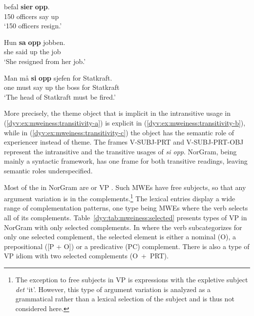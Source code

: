 \documentclass[output=paper]{langsci/langscibook}
\begin{document}
\ea \label{dyv:ex:mweiness:transitivity-a}  befal \textbf{sier} \textbf{opp}. \\ 
     150 officers say up\\
\glt `150 officers resign.' \\ 
\z

\ea \label{dyv:ex:mweiness:transitivity-b} \gll Hun \textbf{sa} \textbf{opp} jobben. \\
     she said up {the job} \\
\glt `She resigned from her job.' \\
\z

\ea \label{dyv:ex:mweiness:transitivity-c} \gll Man må \textbf{si} \textbf{opp} sjefen for Statkraft. \\
      one must say up {the boss} for Statkraft \\
\glt `The head of Statkraft must be fired.' 
\z

More precisely, the theme object that is implicit in the intransitive usage in (\ref{dyv:ex:mweiness:transitivity-a}) is explicit in (\ref{dyv:ex:mweiness:transitivity-b}), while in (\ref{dyv:ex:mweiness:transitivity-c}) the object has the semantic role of experiencer instead of theme.
The frames \textsf{V-SUBJ-PRT} and \textsf{V-SUBJ-PRT-OBJ} represent the intransitive and the transitive usages of \emph{si opp}.
NorGram, being mainly a syntactic framework, has one frame for both transitive readings, leaving semantic roles underspecified. 

Most of the  in NorGram are  or VP .
Such MWEs have free subjects, so that any argument variation is in the complements.\footnote{The exception to free subjects in VP  is expressions with the expletive subject \emph{det} `it'. However, this type of argument variation is analyzed as a grammatical rather than a lexical selection of the subject and is thus not considered here.}
The lexical entries display a wide range of complementation patterns, one type being MWEs where the verb selects all of its complements. 
Table~\ref{dyv:tab:mweiness:selected} presents types of VP  in NorGram with only selected complements. 
In  where the verb subcategorizes for only one selected complement, the selected element is either a nominal (\textsf{O}), a prepositional (\textsf{[P + O]}) or a predicative (\textsf{PC}) complement. 
There is also a type of VP idiom with two selected complements (\textsf{O~+~PRT}).
\end{document}
